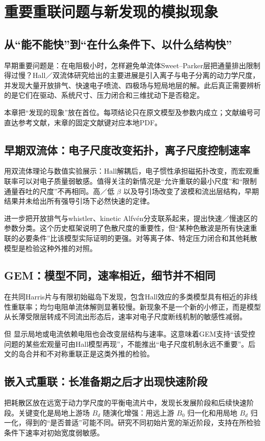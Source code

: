 \chapter{重要重联问题与新发现的模拟现象}\label{ch:findings}
\section{从“能不能快”到“在什么条件下、以什么结构快”}
早期重要问题是：在电阻极小时，怎样避免单流体Sweet--Parker层把通量排出限制得过慢？Hall／双流体研究给出的主要进展是引入离子与电子分离的动力学尺度，并发现大量开放排气、快速电子喷流、四极场与短局地层的解。此后真正需要辨析的是它们在驱动、系统尺寸、压力闭合和三维扰动下是否稳定。

本章把“发现的现象”放在首位。每项结论只在原文模型及参数内成立；文献编号可直达参考文献，末章的固定文献键对应本地PDF。

\section{早期双流体：电子尺度改变拓扑，离子尺度控制速率}
\citet{Biskamp1995,Biskamp1997}用双流体理论与数值实验展示：Hall解耦后，电子惯性承担磁拓扑改变，而宏观重联率可以对电子质量弱敏感。值得关注的新情况是“允许重联的最小尺度”和“限制通量吞吐的尺度”不再相同。高／低 $\beta$ 以及导引场改变了波模和流出层结构，早期结果并未给出所有强导引场下必然快速的定律。

\citet{Rogers2001}进一步把开放排气与whistler、kinetic Alfvén分支联系起来，提出快速／慢速区的参数分类。这个历史框架说明了色散尺度的重要性，但“某种色散波是所有快速重联的必要条件”比该模型实际证明的更强。对等离子体、特定压力闭合和其他耗散模型是检验这种外推的对照。

\section{GEM：模型不同，速率相近，细节并不相同}
\citet{Birn2001,Shay2001,Ma2001}在共同Harris片与有限初始磁岛下发现，包含Hall效应的多类模型具有相近的非线性重联率；均匀电阻单流体解则显著较慢。新现象不是一个新的小修正，而是模型从长薄受限层转成不同流出形态后，速率对电子尺度断线机制的敏感性减弱。

但 \citet{Otto2001,BirnHesse2001}显示局地或电流依赖电阻也会改变层结构与速率。这意味着GEM支持“该受控问题的某些宏观量可由Hall模型再现”，不能推出“电子尺度机制永远不重要”。后文的岛合并和不对称重联正是这类外推的检验。

\section{嵌入式重联：长准备期之后才出现快速阶段}
\citet{Shay2004}把耗散区放在远宽于动力学尺度的平衡电流片中，发现长发展阶段和后续快速阶段。关键变化是局地上游场 $B_d$ 随演化增强：用远上游 $B_0$ 归一化和用局地 $B_d$ 归一化，得到的“是否普适”可能不同。\citet{Huba2004}研究不同初始片宽的渐近阶段，支持在所检验条件下速率对初始宽度弱敏感。


